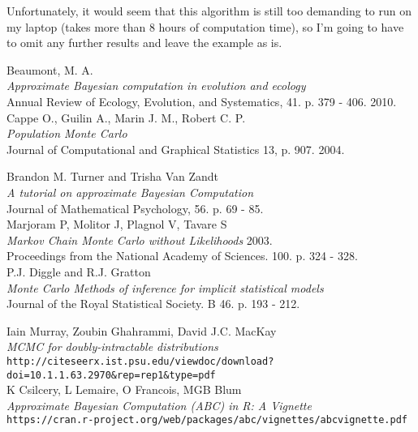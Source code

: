 \documentclass[12pt]{article}
\begin{document}
\vskip 0.2in

Unfortunately, it would seem that this algorithm is still too demanding to run on my laptop (takes more than 8 hours of computation time), so I'm going to have to omit any further results and leave the example as is.







\newpage

\begin{thebibliography}{9}

Beaumont, M. A.\\
\textit{Approximate Bayesian computation in evolution and ecology}\\
Annual Review of Ecology, Evolution, and Systematics, 41. p. 379 - 406. 2010.\\

Cappe O., Guilin A., Marin J. M., Robert C. P.\\
\textit{Population Monte Carlo}\\
Journal of Computational and Graphical Statistics 13, p. 907. 2004.

Brandon M. Turner and Trisha Van Zandt\\
\textit{A tutorial on approximate Bayesian Computation}\\
Journal of Mathematical Psychology, 56. p. 69 - 85.\\

Marjoram P, Molitor J, Plagnol V, Tavare S\\
\textit{Markov Chain Monte Carlo without Likelihoods} 2003.\\
Proceedings from the National Academy of Sciences. 100. p. 324 - 328.\\

P.J. Diggle and R.J. Gratton\\
\textit{Monte Carlo Methods of inference for implicit statistical models}\\
Journal of the Royal Statistical Society. B 46. p. 193 - 212.

Iain Murray, Zoubin Ghahrammi, David J.C. MacKay\\
\textit{MCMC for doubly-intractable distributions}\\
\texttt{http://citeseerx.ist.psu.edu/viewdoc/download?doi=10.1.1.63.2970\&rep=rep1\&type=pdf}\\

K Csilcery, L Lemaire, O Francois, MGB Blum\\
\textit{Approximate Bayesian Computation (ABC) in R: A Vignette}\\
\texttt{https://cran.r-project.org/web/packages/abc/vignettes/abcvignette.pdf}


\end{thebibliography}
\end{document}
